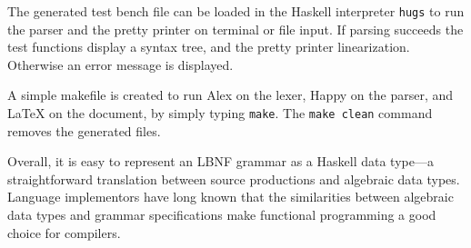 
The generated test bench file can be loaded in the Haskell interpreter \texttt{hugs} to
run the parser and the pretty printer on terminal or file input.
If parsing succeeds the test functions display a syntax tree,
and the pretty printer linearization. Otherwise an error message is displayed.

A simple makefile is created to run Alex on the lexer, Happy on the parser, and
LaTeX on the document, by simply typing {\tt make}. The {\tt make clean}
command removes the generated files.


Overall, it is easy to represent an LBNF grammar as a Haskell data
type---a straightforward translation between source productions and algebraic data types. Language implementors have long known that the similarities between algebraic data types and grammar specifications make functional programming a good choice for compilers.
